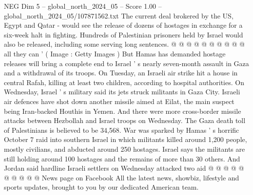\begin{textsample}{NEG Dim 5 – global\_north\_2024\_05 – Score 1.00 – global\_north\_2024\_05/107871562.txt}
The current deal brokered by the US, Egypt and Qatar - would see the release of dozens of hostages in exchange for a six-week halt in fighting.
Hundreds of Palestinian prisoners held by Israel would also be released, including some serving long sentences. @ @ @ @ @ @ @ @ @ @ all they can ' ( Image : Getty Images ) But Hamas has demanded hostage releases will bring a complete end to Israel ' s nearly seven-month assault in Gaza and a withdrawal of its troops.
On Tuesday, an Israeli air strike hit a house in central Rafah, killing at least two children, according to hospital authorities.
On Wednesday, Israel ' s military said its jets struck militants in Gaza City.
Israeli air defences have shot down another missile aimed at Eilat, the main suspect being Iran-backed Houthis in Yemen.
And there were more cross-border missile attacks between Hezbollah and Israel troops on Wednesday.
The Gaza death toll of Palestinians is believed to be 34,568.
War was sparked by Hamas ' s horrific October 7 raid into southern Israel in which militants killed around 1,200 people, mostly civilians, and abducted around 250 hostages.
Israel says the militants are still holding around 100 hostages and the remains of more than 30 others.
And Jordan said hardline Israeli settlers on Wednesday attacked two aid @ @ @ @ @ @ @ @ @ @ News page on Facebook All the latest news, showbiz, lifestyle and sports updates, brought to you by our dedicated American team.

\end{textsample}
